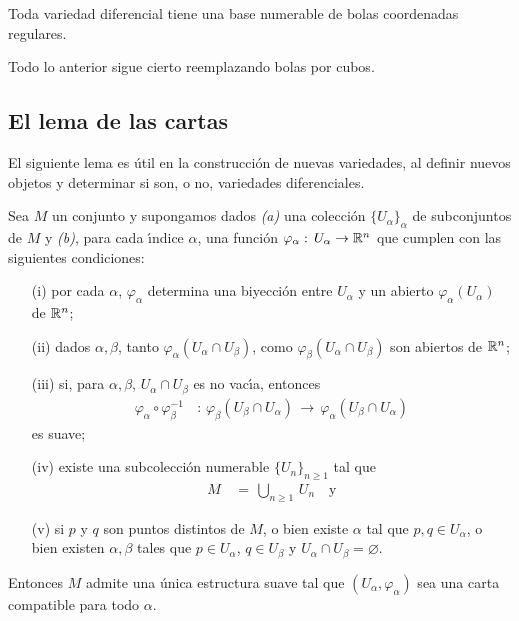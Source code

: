 \begin{lemaDeLasBolasRegulares}\label{thm:delasbolasregulares}
	Toda variedad diferencial tiene una base numerable de bolas
	coordenadas regulares.
\end{lemaDeLasBolasRegulares}

Todo lo anterior sigue cierto reemplazando bolas por cubos.

\subsection{El lema de las cartas}
El siguiente lema es \'{u}til en la construcci\'{o}n de nuevas variedades,
al definir nuevos objetos y determinar si son, o no, variedades diferenciales.

\begin{lemaDeLasCartas}\label{thm:delascartas}
	Sea $M$ un conjunto y supongamos dados \textit{(a)} una colecci\'{o}n
	$\{U_{\alpha}\}_{\alpha}$ de subconjuntos de $M$ y \textit{(b)},
	para cada \'{\i}ndice $\alpha$, una funci\'{o}n
	$\varphi_{\alpha}:\,U_{\alpha}\rightarrow\mathbb{R}^{n}$ que cumplen
	con las siguientes condiciones:
	\begin{itemize}
		\item[(i)] por cada $\alpha$, $\varphi_{\alpha}$ determina
			una biyecci\'{o}n entre $U_{\alpha}$ y un abierto
			$\varphi_{\alpha}(U_{\alpha})$ de $\mathbb{R}^{n}$;
		\item[(ii)] dados $\alpha,\beta$, tanto
			$\varphi_{\alpha}(U_{\alpha}\cap U_{\beta})$, como
			$\varphi_{\beta}(U_{\alpha}\cap U_{\beta})$ son
			abiertos de $\mathbb{R}^{n}$;
		\item[(iii)] si, para $\alpha,\beta$,
			$U_{\alpha}\cap U_{\beta}$ es no vac\'{\i}a, entonces
			\begin{align*}
				\varphi_{\alpha}\circ\varphi_{\beta}^{-1} &
				\,:\,
				\varphi_{\beta}(U_{\beta}\cap U_{\alpha})
				\,\rightarrow\,
				\varphi_{\alpha}(U_{\beta}\cap U_{\alpha})
			\end{align*}
			es suave;
		\item[(iv)] existe una subcolecci\'{o}n numerable
			$\{U_{n}\}_{n\geq 1}$ tal que
			\begin{align*}
				M & \,=\,\bigcup_{n\geq 1}\,U_{n}
				\quad\text{y}
			\end{align*}
		\item[(v)] si $p$ y $q$ son puntos distintos de $M$, o bien
			existe $\alpha$ tal que $p,q\in U_{\alpha}$, o bien
			existen $\alpha,\beta$ tales que $p\in U_{\alpha}$,
			$q\in U_{\beta}$ y
			$U_{\alpha}\cap U_{\beta}=\varnothing$.
	\end{itemize}
	Entonces $M$ admite una \'{u}nica estructura suave tal que
	$(U_{\alpha},\varphi_{\alpha})$ sea una carta compatible para todo
	$\alpha$.
\end{lemaDeLasCartas}

